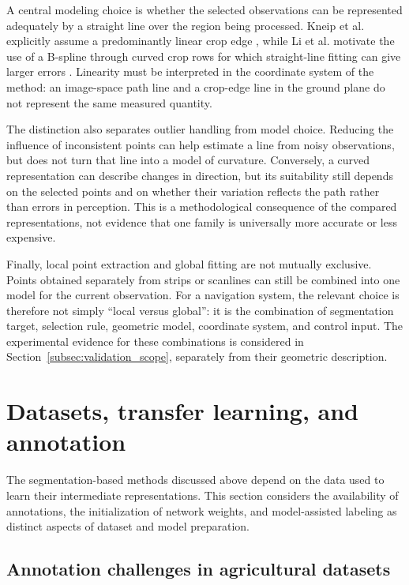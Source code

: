 A central modeling choice is whether the selected observations can be
represented adequately by a straight line over the region being
processed. Kneip et al. explicitly assume a predominantly linear crop
edge \cite[Section~7]{kneip2020cropedge}, while Li et al. motivate the
use of a B-spline through curved crop rows for which straight-line
fitting can give larger errors \cite[Section~2.2.3]{li2022multiroi}.
Linearity must be interpreted in the coordinate system of the method:
an image-space path line and a crop-edge line in the ground plane do
not represent the same measured quantity.

The distinction also separates outlier handling from model choice.
Reducing the influence of inconsistent points can help estimate a line
from noisy observations, but does not turn that line into a model of
curvature. Conversely, a curved representation can describe changes in
direction, but its suitability still depends on the selected points
and on whether their variation reflects the path rather than errors
in perception. This is a methodological consequence of the compared
representations, not evidence that one family is universally more
accurate or less expensive.

Finally, local point extraction and global fitting are not mutually
exclusive. Points obtained separately from strips or scanlines can
still be combined into one model for the current observation. For a
navigation system, the relevant choice is therefore not simply
``local versus global'': it is the combination of segmentation target,
selection rule, geometric model, coordinate system, and control input.
The experimental evidence for these combinations is considered in
Section~\ref{subsec:validation_scope}, separately from their geometric
description.


\section{Datasets, transfer learning, and annotation}
\label{sec:dataset_transfer}

The segmentation-based methods discussed above depend on the data used
to learn their intermediate representations. This section considers the
availability of annotations, the initialization of network weights, and
model-assisted labeling as distinct aspects of dataset and model preparation.

\subsection{Annotation challenges in agricultural datasets}
\label{subsec:scarsita_dataset}

